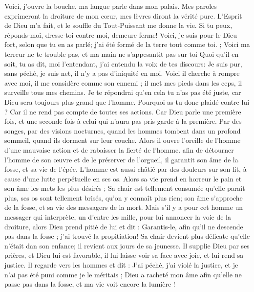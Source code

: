\begin{multicols}{2}
Voici, j'ouvre la bouche, ma langue parle dans mon palais.
Mes paroles exprimeront la droiture de mon cœur, mes lèvres diront la vérité pure.
L'Esprit de Dieu m'a fait, et le souffle du Tout-Puissant me donne la vie.
Si tu peux, réponds-moi, dresse-toi contre moi, demeure ferme!
Voici, je suis pour le Dieu fort, selon que tu en as parlé; j'ai été formé de la terre tout comme toi. ;
Voici ma terreur ne te trouble pas, et ma main ne s'appesantit pas sur toi
Quoi qu'il en soit, tu as dit, moi l'entendant, j'ai entendu la voix de tes discours:
Je suis pur, sans péché, je suis net, il n'y a pas d'iniquité en moi.
Voici il cherche à rompre avec moi, il me considère comme son ennemi ;
il met mes pieds dans les ceps, il surveille tous mes chemins.
Je te répondrai qu'en cela tu n'as pas été juste, car Dieu sera toujours plus grand que l'homme.
Pourquoi as-tu donc plaidé contre lui ? Car il ne rend pas compte de toutes ses actions.
Car Dieu parle une première fois, et une seconde fois à celui qui n'aura pas pris garde à la première.
Par des songes, par des visions nocturnes, quand les hommes tombent dans un profond sommeil, quand ils dorment sur leur couche.
Alors il ouvre l'oreille de l'homme d'une mauvaise action et de rabaisser la fierté de l'homme.
afin de détourner l'homme de son œuvre et de le préserver de l'orgueil,
il garantit son âme de la fosse, et sa vie de l'épée.
L'homme est aussi châtié par des douleurs sur son lit, à cause d'une lutte perpétuelle en ses os.
Alors sa vie prend en horreur le pain et son âme les mets les plus désirés ;
Sa chair est tellement consumée qu'elle paraît plus, ses os sont tellement brisés, qu'on y connaît plus rien;
son âme s'approche de la fosse, et sa vie des messagers de la mort.
Mais s'il y a pour cet homme un messager qui interprète, un d'entre les mille, pour lui annoncer la voie de la droiture,
alors Dieu prend pitié de lui et dit : Garantis-le, afin qu'il ne descende pas dans la fosse ; j'ai trouvé la propitiation!
Sa chair devient plus délicate qu'elle n'était dan son enfance; il revient aux jours de sa jeunesse.
Il supplie Dieu par ses prières, et Dieu lui est favorable, il lui laisse voir sa face avec joie, et lui rend sa justice.
Il regarde vers les hommes et dit : J'ai péché, j'ai violé la justice, et je n'ai pas été puni comme je le méritais ;
Dieu a racheté mon âme afin qu'elle ne passe pas dans la fosse, et ma vie voit encore la lumière !

\end{multicols}
